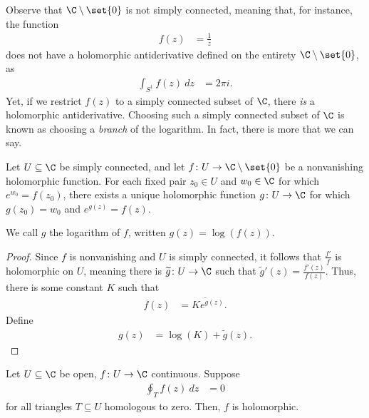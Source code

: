 \documentclass[10pt]{mypackage}
\begin{document}
Observe that $\C\setminus \set{0}$ is not simply connected, meaning that, for instance, the function
\begin{align*}
  f(z) &= \frac{1}{z}
\end{align*}
does not have a holomorphic antiderivative defined on the entirety $\C\setminus \set{0}$, as
\begin{align*}
  \int_{S^1}^{} f(z)\:dz &= 2\pi i.
\end{align*}
Yet, if we restrict $f(z)$ to a simply connected subset of $\C$, there \textit{is} a holomorphic antiderivative. Choosing such a simply connected subset of $\C$ is known as choosing a \textit{branch} of the logarithm. In fact, there is more that we can say.
\begin{corollary}
  Let $U\subseteq \C$ be simply connected, and let $f\colon U\rightarrow \C\setminus \set{0}$ be a nonvanishing holomorphic function. For each fixed pair $z_0\in U$ and $w_0\in \C$ for which $e^{w_0} = f\left( z_0 \right)$, there exists a unique holomorphic function $g\colon U\rightarrow \C$ for which $g\left(z_0\right) = w_0$ and $e^{g(z)} = f(z)$.%

  We call $g$ the logarithm of $f$, written $g(z) = \log\left( f(z) \right)$.
\end{corollary}
\begin{proof}
  Since $f$ is nonvanishing and $U$ is simply connected, it follows that $\frac{f'}{f}$ is holomorphic on $U$, meaning there is $ \widetilde{g}\colon U\rightarrow \C $ such that $\widetilde{g}'(z) = \frac{f'(z)}{f(z)}$. Thus, there is some constant $K$ such that
  \begin{align*}
    f(z) &= Ke^{\widetilde{g}(z)}.
  \end{align*}
  Define
  \begin{align*}
    g(z) &= \log(K) + \widetilde{g}(z).
  \end{align*}
\end{proof}
\begin{theorem}
  Let $U\subseteq \C$ be open, $f\colon U\rightarrow \C$ continuous. Suppose
  \begin{align*}
    \oint_{T}^{} f(z)\:dz &= 0
  \end{align*}
  for all triangles $T\subseteq U$ homologous to zero. Then, $f$ is holomorphic.
\end{theorem}
\end{document}
